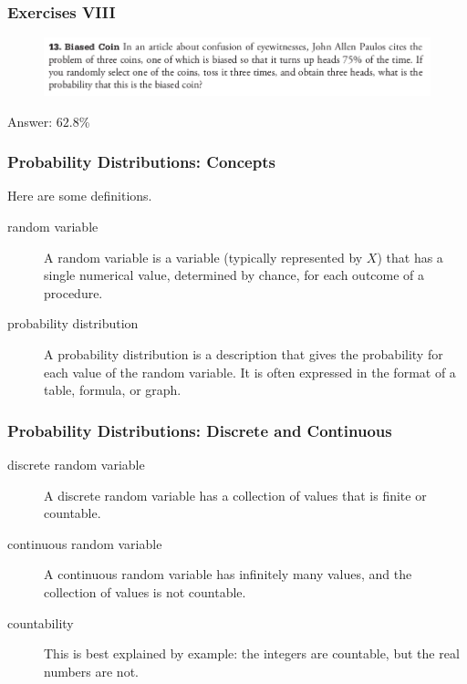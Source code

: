 \documentclass[xcolor=dvipsnames]{beamer}
\begin{document}
\begin{frame}
  \frametitle{Exercises VIII}
\begin{figure}[h]
\includegraphics[scale=.36]{./diagrams/triola_bayes3.png}
\end{figure}
Answer: $62.8$\%
\end{frame}

\begin{frame}
  \frametitle{Probability Distributions: Concepts}
Here are some definitions.
\begin{description}
\item[random variable] A random variable is a variable (typically
  represented by $X$) that has a single numerical value, determined by
  chance, for each outcome of a procedure.
\item[probability distribution] A probability distribution is a
  description that gives the probability for each value of the random
  variable. It is often expressed in the format of a table, formula,
  or graph.
\end{description}
\end{frame}

\begin{frame}
  \frametitle{Probability Distributions: Discrete and Continuous}
\begin{description}
\item[discrete random variable] A \alert{discrete} random variable has
  a collection of values that is finite or countable.
\item[continuous random variable] A \alert{continuous} random variable has
  infinitely many values, and the collection of values is not
  countable.
\item[countability] This is best explained by example: the integers
  are countable, but the real numbers are not.
\end{description}
\end{frame}
\end{document}
